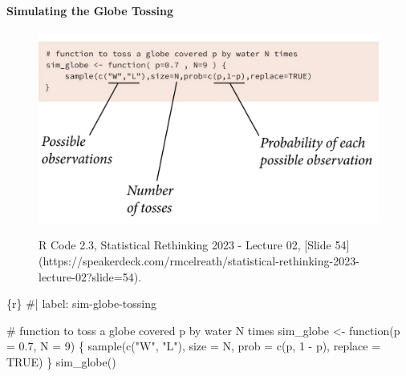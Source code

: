 \documentclass[
  letterpaper,
  DIV=11,
  numbers=noendperiod]{scrreprt}
\let\oldparagraph\paragraph
\renewcommand{\paragraph}[1]{\oldparagraph{#1}\mbox{}}
\newenvironment{Shaded}{\begin{snugshade}}{\end{snugshade}}
\newcommand{\AttributeTok}[1]{\textcolor[rgb]{0.40,0.45,0.13}{#1}}
\newcommand{\CommentTok}[1]{\textcolor[rgb]{0.37,0.37,0.37}{#1}}
\newcommand{\ConstantTok}[1]{\textcolor[rgb]{0.56,0.35,0.01}{#1}}
\newcommand{\ControlFlowTok}[1]{\textcolor[rgb]{0.00,0.23,0.31}{#1}}
\newcommand{\DecValTok}[1]{\textcolor[rgb]{0.68,0.00,0.00}{#1}}
\newcommand{\FloatTok}[1]{\textcolor[rgb]{0.68,0.00,0.00}{#1}}
\newcommand{\FunctionTok}[1]{\textcolor[rgb]{0.28,0.35,0.67}{#1}}
\newcommand{\InformationTok}[1]{\textcolor[rgb]{0.37,0.37,0.37}{#1}}
\newcommand{\NormalTok}[1]{\textcolor[rgb]{0.00,0.23,0.31}{#1}}
\newcommand{\OtherTok}[1]{\textcolor[rgb]{0.00,0.23,0.31}{#1}}
\newcommand{\SpecialCharTok}[1]{\textcolor[rgb]{0.37,0.37,0.37}{#1}}
\newcommand{\StringTok}[1]{\textcolor[rgb]{0.13,0.47,0.30}{#1}}
\begin{document}
\hypertarget{simulating-the-globe-tossing}{%
\paragraph{Simulating the Globe
Tossing}\label{simulating-the-globe-tossing}}

\begin{figure}

{\centering 

\href{https://speakerdeck.com/rmcelreath/statistical-rethinking-2023-lecture-02?slide=54}{\includegraphics{img/code-sim-globe-tossing-min.png}}

}

\caption{R Code 2.3, Statistical Rethinking 2023 - Lecture 02, {[}Slide
54{]}(https://speakerdeck.com/rmcelreath/statistical-rethinking-2023-lecture-02?slide=54).}

\end{figure}

\begin{Shaded}
\begin{Highlighting}[]
\InformationTok{\textasciigrave{}\textasciigrave{}\textasciigrave{}\{r\}}
\CommentTok{\#| label: sim{-}globe{-}tossing}

\CommentTok{\# function to toss a globe covered p by water N times}
\NormalTok{sim\_globe }\OtherTok{\textless{}{-}} \ControlFlowTok{function}\NormalTok{(}\AttributeTok{p =} \FloatTok{0.7}\NormalTok{, }\AttributeTok{N =} \DecValTok{9}\NormalTok{) \{}
  \FunctionTok{sample}\NormalTok{(}\FunctionTok{c}\NormalTok{(}\StringTok{"W"}\NormalTok{, }\StringTok{"L"}\NormalTok{), }\AttributeTok{size =}\NormalTok{ N, }\AttributeTok{prob =} \FunctionTok{c}\NormalTok{(p, }\DecValTok{1} \SpecialCharTok{{-}}\NormalTok{ p), }\AttributeTok{replace =} \ConstantTok{TRUE}\NormalTok{)}
\NormalTok{\}}
\FunctionTok{sim\_globe}\NormalTok{()}
\InformationTok{\textasciigrave{}\textasciigrave{}\textasciigrave{}}
\end{Highlighting}
\end{Shaded}
\end{document}
